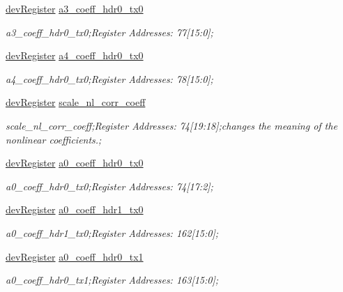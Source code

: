 \begin{DoxyCompactItemize}
\mbox{\hyperlink{classdev_register}{dev\+Register}} \mbox{\hyperlink{class_o_p_t3101_registers_a9ae9f8fb72fdb779aa701cd8fa1caffd}{a3\+\_\+coeff\+\_\+hdr0\+\_\+tx0}}
\begin{DoxyCompactList}\small\item\em a3\+\_\+coeff\+\_\+hdr0\+\_\+tx0;Register Addresses\+: 77\mbox{[}15\+:0\mbox{]}; \end{DoxyCompactList}\item 
\mbox{\hyperlink{classdev_register}{dev\+Register}} \mbox{\hyperlink{class_o_p_t3101_registers_abfe8218cd4665b95d06ee140a334b0e7}{a4\+\_\+coeff\+\_\+hdr0\+\_\+tx0}}
\begin{DoxyCompactList}\small\item\em a4\+\_\+coeff\+\_\+hdr0\+\_\+tx0;Register Addresses\+: 78\mbox{[}15\+:0\mbox{]}; \end{DoxyCompactList}\item 
\mbox{\hyperlink{classdev_register}{dev\+Register}} \mbox{\hyperlink{class_o_p_t3101_registers_a6bde028bd99e808c8136796673c1d0b6}{scale\+\_\+nl\+\_\+corr\+\_\+coeff}}
\begin{DoxyCompactList}\small\item\em scale\+\_\+nl\+\_\+corr\+\_\+coeff;Register Addresses\+: 74\mbox{[}19\+:18\mbox{]};changes the meaning of the nonlinear coefficients.; \end{DoxyCompactList}\item 
\mbox{\hyperlink{classdev_register}{dev\+Register}} \mbox{\hyperlink{class_o_p_t3101_registers_ac1a1e61a1574ab498767e32ed349c13d}{a0\+\_\+coeff\+\_\+hdr0\+\_\+tx0}}
\begin{DoxyCompactList}\small\item\em a0\+\_\+coeff\+\_\+hdr0\+\_\+tx0;Register Addresses\+: 74\mbox{[}17\+:2\mbox{]}; \end{DoxyCompactList}\item 
\mbox{\hyperlink{classdev_register}{dev\+Register}} \mbox{\hyperlink{class_o_p_t3101_registers_a532787e72c34ad09c15622ab9c4ba19f}{a0\+\_\+coeff\+\_\+hdr1\+\_\+tx0}}
\begin{DoxyCompactList}\small\item\em a0\+\_\+coeff\+\_\+hdr1\+\_\+tx0;Register Addresses\+: 162\mbox{[}15\+:0\mbox{]}; \end{DoxyCompactList}\item 
\mbox{\hyperlink{classdev_register}{dev\+Register}} \mbox{\hyperlink{class_o_p_t3101_registers_aee270e1db008f1cbc685d3bd489cdaf3}{a0\+\_\+coeff\+\_\+hdr0\+\_\+tx1}}
\begin{DoxyCompactList}\small\item\em a0\+\_\+coeff\+\_\+hdr0\+\_\+tx1;Register Addresses\+: 163\mbox{[}15\+:0\mbox{]}; \end{DoxyCompactList}\item 

\end{DoxyCompactItemize}
